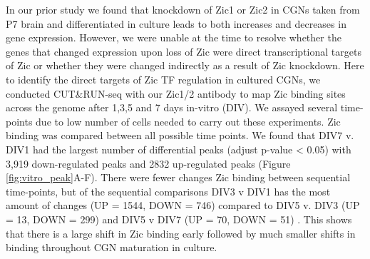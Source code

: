 \documentclass[fleqn,10pt]{wlscirep}
\begin{document}
In our prior study we found that knockdown of Zic1 or Zic2 in CGNs taken from P7 brain and differentiated in culture leads to both increases and decreases in gene expression. However, we were unable at the time to resolve whether the genes that changed expression upon loss of Zic were direct transcriptional targets of Zic or whether they were changed indirectly as a result of Zic knockdown. Here to identify the direct targets of Zic TF regulation in cultured CGNs, we conducted CUT\&RUN-seq with our Zic1/2 antibody to map Zic binding sites across the genome after 1,3,5 and 7 days in-vitro (DIV). We assayed several time-points due to low number of cells needed to carry out these experiments. Zic binding was compared between all possible time points. We found that DIV7 v. DIV1 had the largest number of differential peaks (adjust p-value < 0.05)  with 3,919 down-regulated peaks and 2832 up-regulated peaks (Figure \ref{fig:vitro_peak}A-F). There were fewer changes Zic binding between sequential time-points, but of the sequential comparisons DIV3 v DIV1 has the most amount of changes (UP = 1544, DOWN = 746)  compared to DIV5 v. DIV3 (UP = 13, DOWN = 299) and DIV5 v DIV7 (UP = 70, DOWN = 51) . This shows that there is a large shift in Zic binding early followed by much smaller shifts in binding throughout CGN maturation in culture.
\end{document}
